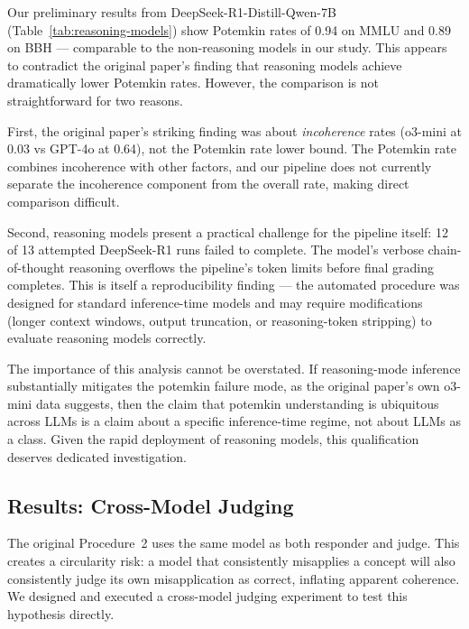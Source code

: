 \documentclass[sigconf,authordraft]{acmart}
\begin{document}
Our preliminary results from DeepSeek-R1-Distill-Qwen-7B (Table~\ref{tab:reasoning-models}) show Potemkin rates of 0.94 on MMLU and 0.89 on BBH --- comparable to the non-reasoning models in our study. This appears to contradict the original paper's finding that reasoning models achieve dramatically lower Potemkin rates. However, the comparison is not straightforward for two reasons.

First, the original paper's striking finding was about \emph{incoherence} rates (o3-mini at 0.03 vs GPT-4o at 0.64), not the Potemkin rate lower bound. The Potemkin rate combines incoherence with other factors, and our pipeline does not currently separate the incoherence component from the overall rate, making direct comparison difficult.

Second, reasoning models present a practical challenge for the pipeline itself: 12 of 13 attempted DeepSeek-R1 runs failed to complete. The model's verbose chain-of-thought reasoning overflows the pipeline's token limits before final grading completes. This is itself a reproducibility finding --- the automated procedure was designed for standard inference-time models and may require modifications (longer context windows, output truncation, or reasoning-token stripping) to evaluate reasoning models correctly.

The importance of this analysis cannot be overstated. If reasoning-mode inference substantially mitigates the potemkin failure mode, as the original paper's own o3-mini data suggests, then the claim that potemkin understanding is ubiquitous across LLMs is a claim about a specific inference-time regime, not about LLMs as a class. Given the rapid deployment of reasoning models, this qualification deserves dedicated investigation.


\subsection{Results: Cross-Model Judging}
\label{sec:cross-judging}

The original Procedure~2 uses the same model as both responder and judge. This creates a circularity risk: a model that consistently misapplies a concept will also consistently judge its own misapplication as correct, inflating apparent coherence. We designed and executed a cross-model judging experiment to test this hypothesis directly.
\end{document}
